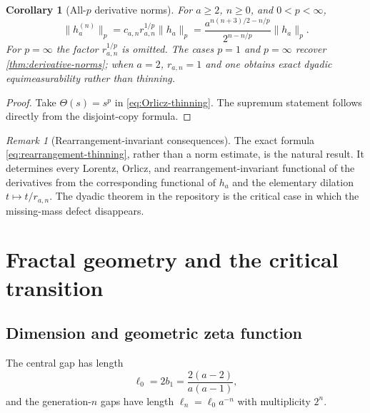\documentclass[11pt,oneside]{article}
\newtheorem{corollary}[theorem]{Corollary}
\theoremstyle{definition}
\theoremstyle{remark}
\newtheorem{remark}[theorem]{Remark}
\begin{document}
\begin{corollary}[All-$p$ derivative norms]
\label{cor:all-p-norms}
For $a\ge2$, $n\ge0$, and $0<p<\infty$,
\begin{equation}
 \boxed{\quad
 \|h_a^{(n)}\|_p
 =c_{a,n}r_{a,n}^{1/p}\|h_a\|_p
 =\frac{a^{n(n+3)/2-n/p}}{2^{n-n/p}}\|h_a\|_p.
 \quad}
 \label{eq:all-p-derivative-norms}
\end{equation}
For $p=\infty$ the factor $r_{a,n}^{1/p}$ is omitted.  The cases $p=1$ and $p=\infty$
recover \cref{thm:derivative-norms}; when $a=2$, $r_{a,n}=1$ and one obtains exact
dyadic equimeasurability rather than thinning.
\end{corollary}

\begin{proof}
Take $\Theta(s)=s^p$ in \eqref{eq:Orlicz-thinning}.  The supremum statement follows directly
from the disjoint-copy formula.
\end{proof}

\begin{remark}[Rearrangement-invariant consequences]
The exact formula \eqref{eq:rearrangement-thinning}, rather than a norm estimate, is the natural
result.  It determines every Lorentz, Orlicz, and rearrangement-invariant functional of the
derivatives from the corresponding functional of $h_a$ and the elementary dilation
$t\mapsto t/r_{a,n}$.  The dyadic theorem in the repository is the critical case in which the
missing-mass defect disappears.
\end{remark}

\section{Fractal geometry and the critical transition}
\label{sec:fractal}

\subsection{Dimension and geometric zeta function}

The central gap has length
\begin{equation}
 \ell_0=2b_1=\frac{2(a-2)}{a(a-1)},
 \label{eq:ell0}
\end{equation}
and the generation-$n$ gaps have length $\ell_n=\ell_0a^{-n}$ with multiplicity $2^n$.
\end{document}
